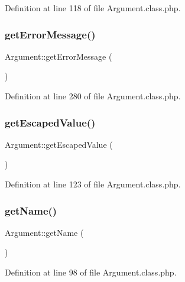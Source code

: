 Definition at line 118 of file Argument.\+class.\+php.

\mbox{\label{classArgument_a6e75159f2fad478ff488bf9cff5ba139}} 
\subsubsection{\texorpdfstring{get\+Error\+Message()}{getErrorMessage()}}
{\footnotesize\ttfamily Argument\+::get\+Error\+Message (\begin{DoxyParamCaption}{ }\end{DoxyParamCaption})}



Definition at line 280 of file Argument.\+class.\+php.

\mbox{\label{classArgument_a02ee73fa63dd2cd754412f176dae54da}} 
\subsubsection{\texorpdfstring{get\+Escaped\+Value()}{getEscapedValue()}}
{\footnotesize\ttfamily Argument\+::get\+Escaped\+Value (\begin{DoxyParamCaption}{ }\end{DoxyParamCaption})}



Definition at line 123 of file Argument.\+class.\+php.

\mbox{\label{classArgument_a592176260424f46cf1b83bf2eb14014e}} 
\subsubsection{\texorpdfstring{get\+Name()}{getName()}}
{\footnotesize\ttfamily Argument\+::get\+Name (\begin{DoxyParamCaption}{ }\end{DoxyParamCaption})}



Definition at line 98 of file Argument.\+class.\+php.

